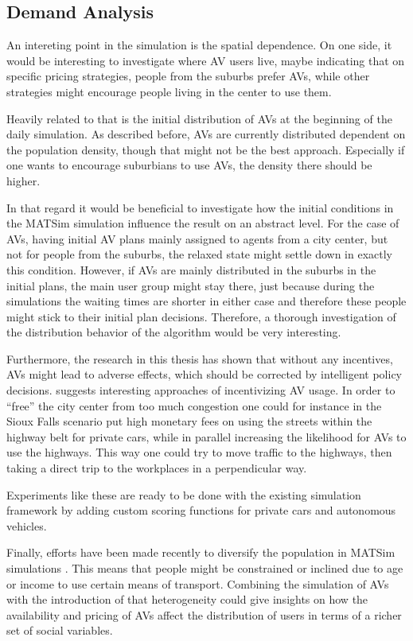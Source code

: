 \subsection{Demand Analysis}

An intereting point in the simulation is the spatial dependence. On one side,
it would be interesting to investigate where AV users live, maybe indicating that
on specific pricing strategies, people from the suburbs prefer AVs, while other
strategies might encourage people living in the center to use them.

Heavily related to that is the initial distribution of AVs at the beginning
of the daily simulation. As described before, AVs are currently distributed dependent on
the population density, though that might not be the best approach. Especially
if one wants to encourage suburbians to use AVs, the density there should be higher.

In that regard it would be beneficial to investigate how the initial conditions
in the MATSim simulation influence the result on an abstract level. For the case of
AVs, having initial AV plans mainly assigned to agents from a city center, but not for people
from the suburbs, the relaxed state might settle down in exactly this condition.
However, if AVs are mainly distributed in the suburbs in the initial plans, the
main user group might stay there, just because during the simulations the waiting
times are shorter in either case and therefore these people might stick to their
initial plan decisions. Therefore, a thorough investigation of the distribution
behavior of the algorithm would be very interesting.

Furthermore, the research in this thesis has shown that without any incentives, AVs might lead
to adverse effects, which should be corrected by intelligent policy decisions.  suggests
interesting approaches of incentivizing AV usage. In order to ``free'' the city center
from too much congestion one could for instance in the Sioux Falls scenario put high monetary fees on using the streets within the
highway belt for private cars, while in parallel increasing the likelihood for AVs
to use the highways. This way one could try to move traffic to the highways, then
taking a direct trip to the workplaces in a perpendicular way.

Experiments like these are ready to be done with the existing simulation framework
by adding custom scoring functions for private cars and autonomous vehicles.

Finally, efforts have been made recently to diversify the population in MATSim simulations \citep{Chakirov2015}.
This means that people might be constrained or inclined due to age or income to use certain means
of transport. Combining the simulation of AVs with the introduction of that heterogeneity
could give insights on how the availability and pricing of AVs affect the distribution
of users in terms of a richer set of social variables.
